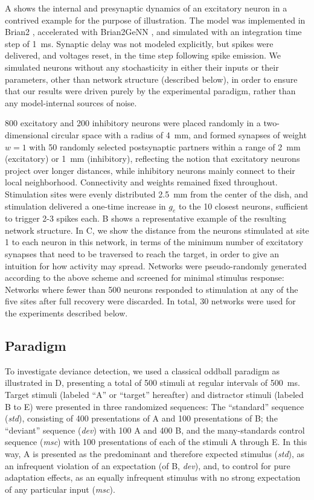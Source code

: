 \documentclass[9pt,lineno,onehalfspacing]{elife}
\newcommand{\dev}{\textit{dev}}
\newcommand{\msc}{\textit{msc}}
\newcommand{\std}{\textit{std}}
\begin{document}
A shows the internal and presynaptic dynamics of an excitatory neuron in a contrived example for the purpose of illustration. The model was implemented in Brian2 \citep{Stimberg2019-tc}, accelerated with Brian2GeNN \citep{Stimberg2020-go}, and simulated with an integration time step of 1~ms. Synaptic delay was not modeled explicitly, but spikes were delivered, and voltages reset, in the time step following spike emission. We simulated neurons without any stochasticity in either their inputs or their parameters, other than network structure (described below), in order to ensure that our results were driven purely by the experimental paradigm, rather than any model-internal sources of noise.

800 excitatory and 200 inhibitory neurons were placed randomly in a two-dimensional circular space with a radius of 4~mm, and formed synapses of weight $w = 1$ with 50 randomly selected postsynaptic partners within a range of 2~mm (excitatory) or 1~mm (inhibitory), reflecting the notion that excitatory neurons project over longer distances, while inhibitory neurons mainly connect to their local neighborhood. Connectivity and weights remained fixed throughout. Stimulation sites were evenly distributed 2.5~mm from the center of the dish, and stimulation delivered a one-time increase in $g_e$ to the 10 closest neurons, sufficient to trigger 2-3 spikes each. B shows a representative example of the resulting network structure. In C, we show the distance from the neurons stimulated at site 1 to each neuron in this network, in terms of the minimum number of excitatory synapses that need to be traversed to reach the target, in order to give an intuition for how activity may spread. Networks were pseudo-randomly generated according to the above scheme and screened for minimal stimulus response: Networks where fewer than 500 neurons responded to stimulation at any of the five sites after full recovery were discarded. In total, 30 networks were used for the experiments described below.

\subsection{Paradigm}\label{sec:paradigm}

To investigate deviance detection, we used a classical oddball paradigm as illustrated in D, presenting a total of 500 stimuli at regular intervals of 500~ms. Target stimuli (labeled ``A'' or ``target'' hereafter) and distractor stimuli (labeled B to E) were presented in three randomized sequences: The ``standard'' sequence (\std{}), consisting of 400 presentations of A and 100 presentations of B; the ``deviant'' sequence (\dev{}) with 100 A and 400 B, and the many-standards control sequence (\msc{}) with 100 presentations of each of the stimuli A through E. In this way, A is presented as the predominant and therefore expected stimulus (\std{}), as an infrequent violation of an expectation (of B, \dev{}), and, to control for pure adaptation effects, as an equally infrequent stimulus with no strong expectation of any particular input (\msc{}).
\end{document}
